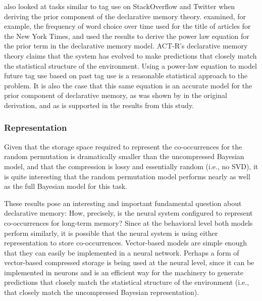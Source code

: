 \documentclass[man,floatsintext,donotrepeattitle]{apa6}
\begin{document}
\textcite{Anderson1991} also looked at tasks similar to tag use on StackOverflow and Twitter when deriving the prior component of the declarative memory theory.
\citeauthor{Anderson1991} examined, for example, the frequency of word choice over time used for the title of articles for the New York Times,
and used the results to derive the power law equation for the prior term in the declarative memory model.
ACT-R's declarative memory theory claims that the system has evolved to make predictions that closely match the statistical structure of the environment.
Using a power-law equation to model future tag use based on past tag use is a reasonable statistical approach to the problem.
It is also the case that this same equation is an accurate model for the prior component of declarative memory, as was shown by \citeauthor{Anderson1991} in the original derivation, 
and as is supported in the results from this study.

\subsubsection{Representation}

Given that the storage space required to represent the co-occurrences for the random permutation is dramatically smaller than the uncompressed Bayesian model,
and that the compression is lossy and essentially random (i.e., no SVD),
it is quite interesting that the random permutation model performs nearly as well as the full Bayesian model for this task.

These results pose an interesting and important fundamental question about declarative memory:
How, precisely, is the neural system configured to represent co-occurrences for long-term memory?
Since at the behavioral level both models perform similarly, it is possible that the neural system is using either representation to store co-occurrences.
Vector-based models are simple enough that they can easily be implemented in a neural network.
Perhaps a form of vector-based compressed storage is being used at the neural level,
since it can be implemented in neurons and is an efficient way for the machinery to generate predictions that closely match the statistical structure of the environment
(i.e., that closely match the uncompressed Bayesian representation).
\end{document}
